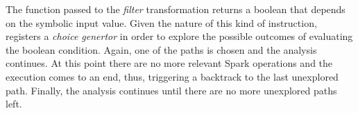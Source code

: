 The function passed to the \textit{filter} transformation returns a boolean that depends on the symbolic input value. Given the nature of this kind of instruction, \spf registers a \textit{choice genertor} in order to explore the possible outcomes of evaluating the boolean condition. Again, one of the paths is chosen and the analysis continues. At this point there are no more relevant Spark operations and the execution comes to an end, thus, triggering a backtrack to the last unexplored path. Finally, the analysis continues until there are no more unexplored paths left.
